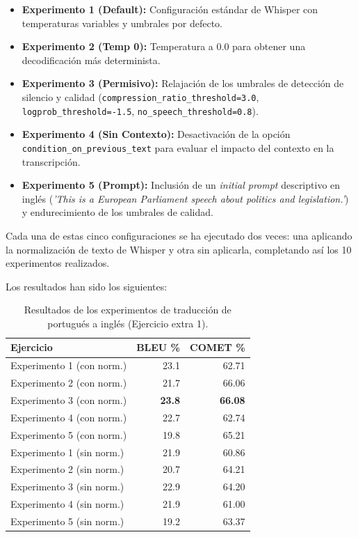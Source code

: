 \documentclass[11pt,spanish,listoffigures,listoftables]{tfgetsinf}
\begin{document}
\begin{itemize}
  \item \textbf{Experimento 1 (Default):} Configuración estándar de Whisper con temperaturas variables y umbrales por defecto.
  \item \textbf{Experimento 2 (Temp 0):} Temperatura a 0.0 para obtener una decodificación más determinista.
  \item \textbf{Experimento 3 (Permisivo):} Relajación de los umbrales de detección de silencio y calidad (\texttt{compression\_ratio\_threshold=3.0}, \texttt{logprob\_threshold=-1.5}, \texttt{no\_speech\_threshold=0.8}).
  \item \textbf{Experimento 4 (Sin Contexto):} Desactivación de la opción \texttt{condition\_on\_previous\_text} para evaluar el impacto del contexto en la transcripción.
  \item \textbf{Experimento 5 (Prompt):} Inclusión de un \textit{initial prompt} descriptivo en inglés (\textit{'This is a European Parliament speech about politics and legislation.'}) y endurecimiento de los umbrales de calidad.
\end{itemize}

Cada una de estas cinco configuraciones se ha ejecutado dos veces: una aplicando la normalización de texto de Whisper y otra sin aplicarla, completando así los 10 experimentos realizados.

Los resultados han sido los siguientes:
\begin{table}[H]
\centering
\begin{tabular}{lrr}
	\toprule
	\textbf{Ejercicio}  & \textbf{BLEU \%} & \textbf{COMET \%} \\
	\midrule
	Experimento 1 (con norm.) & 23.1 & 62.71 \\
	Experimento 2 (con norm.) & 21.7 & 66.06 \\
	Experimento 3 (con norm.) & \textbf{23.8} & \textbf{66.08} \\
	Experimento 4 (con norm.) & 22.7 & 62.74 \\
	Experimento 5 (con norm.) & 19.8 & 65.21 \\
	Experimento 1 (sin norm.) & 21.9 & 60.86 \\
	Experimento 2 (sin norm.) & 20.7 & 64.21 \\
	Experimento 3 (sin norm.) & 22.9 & 64.20 \\
	Experimento 4 (sin norm.) & 21.9 & 61.00 \\
	Experimento 5 (sin norm.) & 19.2 & 63.37 \\
	\bottomrule
\end{tabular}
\caption{Resultados de los experimentos de traducción de portugués a inglés (Ejercicio extra 1).}
\label{tab:commet_blue_extra1}
\end{table}
\end{document}
